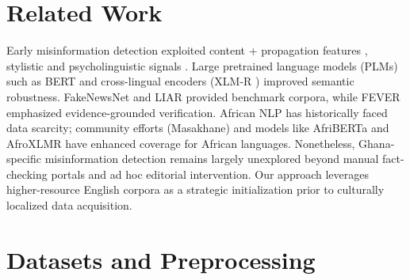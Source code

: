 \documentclass[runningheads]{llncs}
\begin{document}
\section{Related Work}
Early misinformation detection exploited content + propagation features \cite{castillo2011}, stylistic and psycholinguistic signals \cite{rashkin2017truth}. Large pretrained language models (PLMs) such as BERT \cite{devlin2019bert} and cross-lingual encoders (XLM-R \cite{conneau2020xlmr}) improved semantic robustness. FakeNewsNet \cite{shu2020fakenewsnet} and LIAR \cite{wang2017liar} provided benchmark corpora, while FEVER \cite{thorne2018fever} emphasized evidence-grounded verification. African NLP has historically faced data scarcity; community efforts (Masakhane) and models like AfriBERTa \cite{ogueji2021} and AfroXLMR have enhanced coverage for African languages. Nonetheless, Ghana-specific misinformation detection remains largely unexplored beyond manual fact-checking portals and ad hoc editorial intervention. Our approach leverages higher-resource English corpora as a strategic initialization prior to culturally localized data acquisition.

\section{Datasets and Preprocessing}
\end{document}
